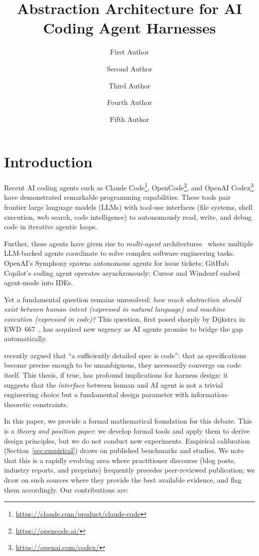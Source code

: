 \documentclass[11pt, a4paper, logo, copyright]{googledeepmind}
\title{Abstraction Architecture for AI Coding Agent Harnesses}
\author[1]{First Author}
\author[2]{Second Author}
\author[2]{Third Author}
\author[1]{Fourth Author}
\author[1]{Fifth Author}
\affil[]{Pragnition Labs}
\affil[*]{Equal Contribution}
\affil[1]{Affiliation 1}
\affil[2]{Affiliation 2}
\begin{document}
\maketitle


\section{Introduction}

Recent AI coding agents such as Claude Code\footnote{\url{https://claude.com/product/claude-code}}, OpenCode\footnote{\url{https://opencode.ai/}}, and OpenAI Codex\footnote{\url{https://openai.com/codex/}} have demonstrated remarkable programming capabilities. These tools pair frontier large language models (LLMs) with tool-use interfaces (file systems, shell execution, web search, code intelligence) to autonomously read, write, and debug code in iterative agentic loops.

Further, these agents have given rise to \emph{multi-agent} architectures~\citep{kim2025scaling} where multiple LLM-backed agents coordinate to solve complex software engineering tasks. OpenAI's Symphony spawns autonomous agents for issue tickets; GitHub Copilot's coding agent operates asynchronously; Cursor and Windsurf embed agent-mode into IDEs.

Yet a fundamental question remains unresolved: \emph{how much abstraction should exist between human intent (expressed in natural language) and machine execution (expressed in code)?} This question, first posed sharply by Dijkstra in EWD~667~\citep{dijkstra1978foolishness}, has acquired new urgency as AI agents promise to bridge the gap automatically.

\citet{gonzalez2026spec} recently argued that ``a sufficiently detailed spec is code'': that as specifications become precise enough to be unambiguous, they necessarily converge on code itself. This thesis, if true, has profound implications for harness design: it suggests that the \emph{interface} between human and AI agent is not a trivial engineering choice but a fundamental design parameter with information-theoretic constraints.

In this paper, we provide a formal mathematical foundation for this debate. This is a \emph{theory and position paper}: we develop formal tools and apply them to derive design principles, but we do not conduct new experiments. Empirical calibration (Section~\ref{sec:empirical}) draws on published benchmarks and studies. We note that this is a rapidly evolving area where practitioner discourse (blog posts, industry reports, and preprints) frequently precedes peer-reviewed publication; we draw on such sources where they provide the best available evidence, and flag them accordingly. Our contributions are:
\end{document}
